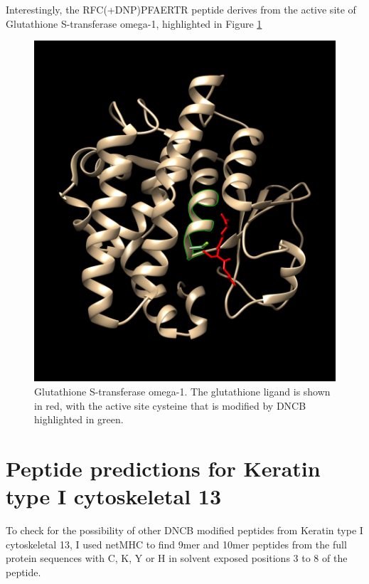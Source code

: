 \documentclass[12pt,]{book}
\begin{document}
Interestingly, the RFC(+DNP)PFAERTR peptide derives from the active site
of Glutathione S-transferase omega-1, highlighted in Figure
\ref{fig:glut-omg}





\begin{figure}

{\centering \includegraphics[width=1\linewidth]{img/glut_transferase} 

}

\caption{Glutathione S-transferase omega-1. The glutathione ligand
is shown in red, with the active site cysteine that is modified by DNCB
highlighted in green.}\label{fig:glut-omg}
\end{figure}

\section{Peptide predictions for Keratin type I cytoskeletal
13}\label{peptide-predictions-for-keratin-type-i-cytoskeletal-13}

To check for the possibility of other DNCB modified peptides from
Keratin type I cytoskeletal 13, I used netMHC to find 9mer and 10mer
peptides from the full protein sequences with C, K, Y or H in solvent
exposed positions 3 to 8 of the peptide.
\end{document}
